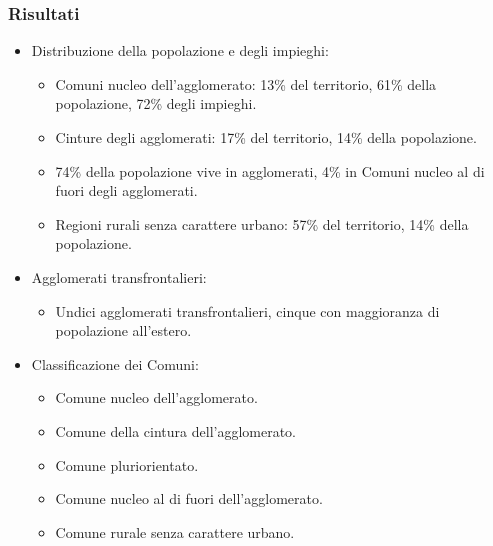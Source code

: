\documentclass{article}
\begin{document}
\subsubsection{Risultati}
\begin{itemize}
    \item Distribuzione della popolazione e degli impieghi:
    \begin{itemize}
        \item Comuni nucleo dell’agglomerato: 13\% del territorio, 61\% della popolazione,
            72\% degli impieghi.
        \item Cinture degli agglomerati: 17\% del territorio, 14\% della popolazione.
        \item 74\% della popolazione vive in agglomerati, 4\% in Comuni nucleo al di fuori
            degli agglomerati.
        \item Regioni rurali senza carattere urbano: 57\% del territorio, 14\% della
            popolazione.
    \end{itemize}
    \item Agglomerati transfrontalieri:
    \begin{itemize}
        \item Undici agglomerati transfrontalieri, cinque con maggioranza di popolazione
            all’estero.
    \end{itemize}
    \item Classificazione dei Comuni:
    \begin{itemize}
        \item Comune nucleo dell’agglomerato.
        \item Comune della cintura dell’agglomerato.
        \item Comune pluriorientato.
        \item Comune nucleo al di fuori dell’agglomerato.
        \item Comune rurale senza carattere urbano.
    \end{itemize}
\end{itemize}
\end{document}
